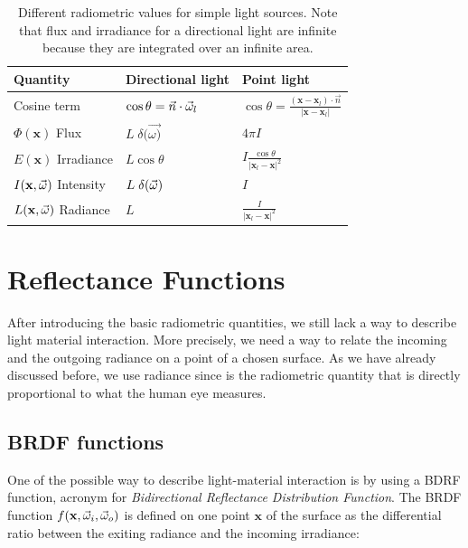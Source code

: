 \renewcommand{\arraystretch}{1.8}
\begin{table}[!ht]
    \centering
    \begin{tabularx}{0.95\textwidth}{|X|X|X|}
    \hline
    Quantity   & Directional light & Point light \\ \hline
    Cosine term       & $\cos\theta = \vec{n} \cdot \vec{\omega}_l$ & $\cos\theta = \frac{(\mathbf{x} - \mathbf{x}_l) \cdot \vec{n}}{|\mathbf{x} - \mathbf{x}_l|}$     \\ \hline

    $\Phi(\mathbf{x})$ Flux       & $L\; \delta(\vec{\omega)}$                  & $4 \pi I$           \\ \hline
    $E(\mathbf{x})$ Irradiance & $L \cos\theta $                 & $I \frac{\cos\theta}{|\mathbf{x}_l - \mathbf{x}|^2}$          \\ \hline
    $I(\mathbf{x},\vec{\omega})$ Intensity  & $L\; \delta(\vec{\omega})$                 & $I$           \\ \hline
    $L(\mathbf{x},\vec{\omega})$ Radiance   & $L$               & $\frac{I}{|\mathbf{x}_l - \mathbf{x}|^2}$           \\ \hline
    \end{tabularx}
\caption{Different radiometric values for simple light sources. Note that flux and irradiance for a directional light are infinite because they are integrated over an infinite area.}
\label{table:radio}
\end{table}

\section{Reflectance Functions}
 
After introducing the basic radiometric quantities, we still lack a way to describe light material interaction. More precisely, we need a way to relate the incoming and the outgoing radiance on a point of a chosen surface. As we have already discussed before, we use radiance since is the radiometric quantity that is directly proportional to what the human eye measures. 

\subsection{BRDF functions}

One of the possible way to describe light-material interaction is by using a BDRF function, acronym for \emph{Bidirectional Reflectance Distribution Function}. The BRDF function $f(\mathbf{x}, \vec{\omega}_i, \vec{\omega}_o)$ is defined on one point $\mathbf{x}$ of the surface as the differential ratio between the exiting radiance and the incoming irradiance:

